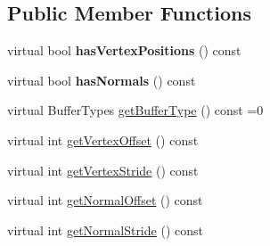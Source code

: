 \subsection*{Public Member Functions}
\begin{DoxyCompactItemize}
\item 
\mbox{\label{classbtVertexBufferDescriptor_a1b4a0ce94d997324610e8b98e228d5fb}} 
virtual bool {\bfseries has\+Vertex\+Positions} () const
\item 
\mbox{\label{classbtVertexBufferDescriptor_a642695b86669cddd89bdae550a8332bb}} 
virtual bool {\bfseries has\+Normals} () const
\item 
virtual Buffer\+Types \hyperlink{classbtVertexBufferDescriptor_a1744d7c3b3452f130a215927d63ab130}{get\+Buffer\+Type} () const =0
\item 
virtual int \hyperlink{classbtVertexBufferDescriptor_a4aa0eefd247d63f25f142ffaa5203768}{get\+Vertex\+Offset} () const
\item 
virtual int \hyperlink{classbtVertexBufferDescriptor_af6dd3dc1695b1837d5706337d659a60e}{get\+Vertex\+Stride} () const
\item 
virtual int \hyperlink{classbtVertexBufferDescriptor_a38dab3efcecf209f8d2486b2cc6c2288}{get\+Normal\+Offset} () const
\item 
virtual int \hyperlink{classbtVertexBufferDescriptor_a7a5c20d4d889bfc14d169c9d94586bb4}{get\+Normal\+Stride} () const
\end{DoxyCompactItemize}
